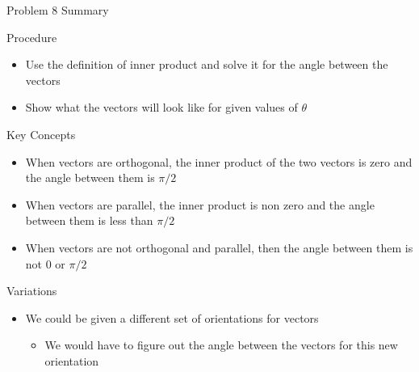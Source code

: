 \begin{summary}{Problem 8 Summary}
    \begin{statement}{Procedure}
        \begin{itemize}
            \item Use the definition of inner product and solve it for the angle between the vectors
            \item Show what the vectors will look like for given values of $\theta$
        \end{itemize}
    \end{statement}
    \begin{statement}{Key Concepts}
        \begin{itemize}
            \item When vectors are orthogonal, the inner product of the two vectors is zero and the angle between them is $\pi / 2$
            \item When vectors are parallel, the inner product is non zero and the angle between them is less than $\pi / 2$
            \item When vectors are not orthogonal and parallel, then the angle between them is not 0 or $\pi / 2$
        \end{itemize}
    \end{statement}
    \begin{statement}{Variations}
        \begin{itemize}
            \item We could be given a different set of orientations for vectors
            \begin{itemize}
                \item We would have to figure out the angle between the vectors for this new orientation
            \end{itemize}
        \end{itemize}
    \end{statement}
\end{summary}

